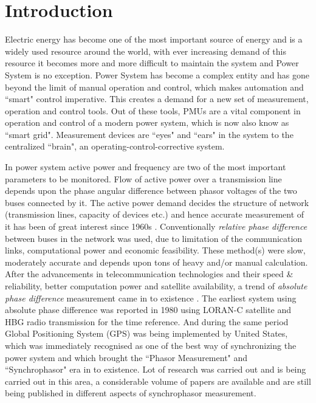 \chapter{Introduction}
\setcounter{page}{1}

Electric energy has become one of the most important source of energy and is a widely used resource around the world, with ever increasing demand of this resource it becomes more and more difficult to maintain the system and Power System is no exception. Power System has become a complex entity and has gone beyond the limit of manual operation and control, which makes automation and ``smart" control imperative. This creates a demand for a new set of measurement, operation and control tools. Out of these tools, PMUs are a vital component in operation and control of a modern power system, which is now also know as ``smart grid". Measurement devices are ``eyes" and ``ears" in the system to the centralized ``brain", an operating-control-corrective system.  

In power system active power and frequency are two of the most important parameters to be monitored. Flow of active power over a transmission line depends upon the phase angular difference between phasor voltages of the two buses connected by it. The active power demand decides the structure of network (transmission lines, capacity of devices etc.) and hence accurate measurement of it has been of great interest since 1960s \cite{agphadkebook}. Conventionally \emph{relative phase difference} between buses in the network was used, due to limitation of the communication links, computational power and  economic feasibility. These method(s) were slow, moderately accurate and depends upon tons of heavy and/or manual calculation. 
After the advancements in telecommunication technologies and their speed \& reliability, better computation power and satellite availability, a trend of \emph{absolute phase difference} measurement came in to existence \cite{PMUhist}. The earliest system using absolute phase difference was reported in 1980 using LORAN-C satellite and HBG radio transmission for the time reference. And during the same period Global Positioning System (GPS) was being implemented by United States, which was immediately recognised as one of the best way of synchronizing the power system and which brought the ``Phasor Measurement" and ``Synchrophasor" era in to existence. Lot of research was carried out and is being carried out in this area, a considerable volume of papers are available and are still being published in different aspects of synchrophasor measurement.


